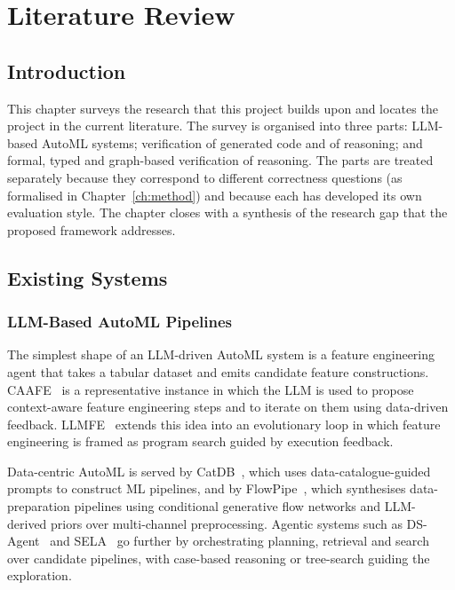 \chapter{Literature Review}
\label{ch:lit}

\section{Introduction}

This chapter surveys the research that this project builds upon and
locates the project in the current literature. The survey is
organised into three parts: LLM-based AutoML systems; verification
of generated code and of reasoning; and formal, typed and
graph-based verification of reasoning. The parts are treated
separately because they correspond to different correctness questions
(as formalised in Chapter~\ref{ch:method}) and because each has
developed its own evaluation style. The chapter closes with a
synthesis of the research gap that the proposed framework addresses.

\section{Existing Systems}

\subsection{LLM-Based AutoML Pipelines}

The simplest shape of an LLM-driven AutoML system is a feature
engineering agent that takes a tabular dataset and emits candidate
feature constructions. CAAFE~\cite{caafe} is a representative
instance in which the LLM is used to propose context-aware feature
engineering steps and to iterate on them using data-driven
feedback. LLMFE~\cite{llmfe} extends this idea into an evolutionary
loop in which feature engineering is framed as program search guided
by execution feedback.

Data-centric AutoML is served by CatDB~\cite{catdb}, which uses
data-catalogue-guided prompts to construct ML pipelines, and by
FlowPipe~\cite{flowpipe}, which synthesises data-preparation
pipelines using conditional generative flow networks and
LLM-derived priors over multi-channel preprocessing. Agentic
systems such as DS-Agent~\cite{dsagent} and SELA~\cite{sela} go
further by orchestrating planning, retrieval and search over
candidate pipelines, with case-based reasoning or tree-search
guiding the exploration.

